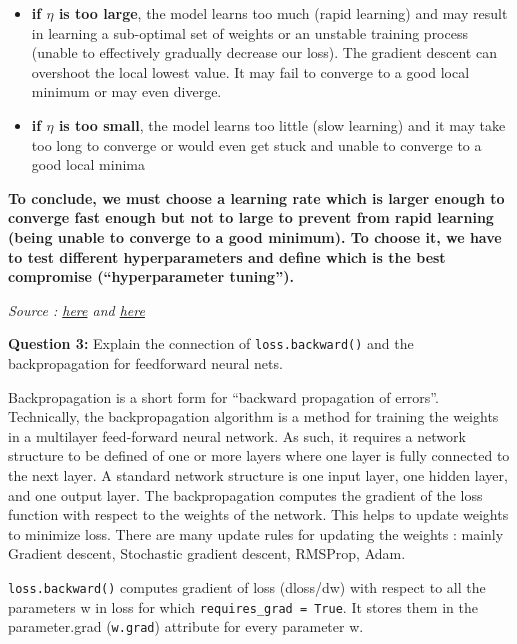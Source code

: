 \documentclass[10pt,a4paper]{article}
\theoremstyle{break}
\begin{document}
\begin{itemize}
\item
  \textbf{if \(\eta\) is too large}, the model learns too much (rapid learning) and may result in learning a sub-optimal set of weights or an unstable training process (unable to effectively gradually decrease our loss). The gradient descent can overshoot the local lowest value. It may fail to converge to a good local minimum or may even diverge.
\item
  \textbf{if \(\eta\) is too small}, the model learns too little (slow learning) and it may take too long to converge or would even get stuck and unable to converge to a good local minima
\end{itemize}

\textbf{\faArrowCircleRight{} To conclude, we must choose a learning rate which is larger enough to converge fast enough but not to large to prevent from rapid learning (being unable to converge to a good minimum). To choose it, we have to test different hyperparameters and define which is the best compromise (``hyperparameter tuning'').}

\emph{Source : \href{https://machinelearningmastery.com/understand-the-dynamics-of-learning-rate-on-deep-learning-neural-networks/}{here} and \href{https://www.deeplearningwizard.com/deep_learning/boosting_models_pytorch/lr_scheduling/}{here}}

\begin{tcolorbox}

\textbf{Question 3:} Explain the connection of \texttt{loss.backward()} and the backpropagation for feedforward neural nets.

\end{tcolorbox}

Backpropagation is a short form for ``backward propagation of errors''. Technically, the backpropagation algorithm is a method for training the weights in a multilayer feed-forward neural network. As such, it requires a network structure to be defined of one or more layers where one layer is fully connected to the next layer. A standard network structure is one input layer, one hidden layer, and one output layer.
The backpropagation computes the gradient of the loss function with respect to the weights of the network. This helps to update weights to minimize loss. There are many update rules for updating the weights : mainly Gradient descent, Stochastic gradient descent, RMSProp, Adam.

\texttt{loss.backward()} computes gradient of loss (dloss/dw) with respect to all the parameters w in loss for which \texttt{requires\_grad\ =\ True}. It stores them in the parameter.grad (\texttt{w.grad}) attribute for every parameter w.
\end{document}
